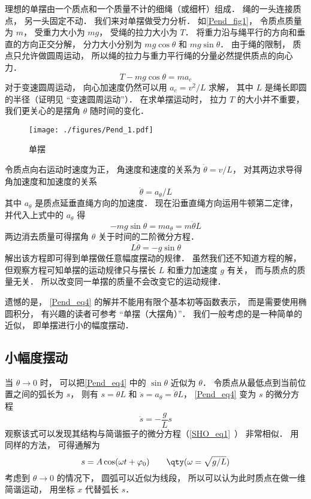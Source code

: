

理想的单摆由一个质点和一个质量不计的细绳（或细杆）组成． 绳的一头连接质点， 另一头固定不动． 我们来对单摆做受力分析． 如\autoref{Pend_fig1}， 令质点质量为 $m$， 受重力大小为 $mg$， 受绳的拉力大小为 $T$． 将重力沿与绳平行的方向和垂直的方向正交分解， 分力大小分别为 $mg\cos\theta$ 和 $mg\sin\theta$． 由于绳的限制， 质点只允许做圆周运动， 所以绳的拉力与重力平行绳的分量必然提供质点的向心力．
\begin{equation}
T - mg\cos\theta = ma_c
\end{equation}
对于变速圆周运动， 向心加速度仍然可以用 $a_c = v^2/L$ 求解， 其中 $L$ 是绳长即圆的半径（证明见 “变速圆周运动”）．%
在求单摆运动时， 拉力 $T$ 的大小并不重要， 我们更关心的是摆角 $\theta$ 随时间的变化．
\begin{figure}[ht]
\centering
\texttt{[image: ./figures/Pend\_1.pdf]}
\caption{单摆} \label{Pend_fig1}
\end{figure}

令质点向右运动时速度为正， 角速度和速度的关系为 $\dot\theta = v/L$， 对其两边求导得角加速度和加速度的关系
\begin{equation}
\ddot\theta = a_\theta/L
\end{equation}
其中 $a_\theta$ 是质点延垂直绳方向的加速度． 现在沿垂直绳方向运用牛顿第二定律， 并代入上式中的 $a_\theta$ 得
\begin{equation}
-mg\sin\theta = ma_\theta = m\ddot\theta L
\end{equation}
两边消去质量可得摆角 $\theta$ 关于时间的二阶微分方程．
\begin{equation}\label{Pend_eq4}
L\ddot\theta = - g\sin\theta
\end{equation}
解出该方程即可得到单摆做任意幅度摆动的规律． 虽然我们还不知道方程的解， 但观察方程可知单摆的运动规律只与摆长 $L$ 和重力加速度 $g$ 有关， 而与质点的质量无关． 所以改变同一单摆的质量不会改变它的运动规律．

遗憾的是， \autoref{Pend_eq4} 的解并不能用有限个基本初等函数表示， 而是需要使用椭圆积分， 有兴趣的读者可参考 “单摆（大摆角）”． 我们一般考虑的是一种简单的近似， 即单摆进行小的幅度摆动．

\subsection{小幅度摆动}
当 $\theta \to 0$ 时， 可以把\autoref{Pend_eq4} 中的 $\sin\theta$ 近似为 $\theta$． 令质点从最低点到当前位置之间的弧长为 $s$， 则有 $s = \theta L$ 和 $\ddot s = a_\theta = \ddot\theta L$， \autoref{Pend_eq4} 变为 $s$ 的微分方程
\begin{equation}
\ddot s = - \frac gL s
\end{equation}
观察该式可以发现其结构与简谐振子的微分方程（\autoref{SHO_eq1}~） 非常相似． 用同样的方法， 可得通解为
\begin{equation}
s = A\cos(\omega t + \varphi_0)  \qquad \qty(\omega  = \sqrt{g/L})
\end{equation}
考虑到 $\theta \to 0$ 的情况下， 圆弧可以近似为线段， 所以可以认为此时质点在做一维简谐运动， 用坐标 $x$ 代替弧长 $s$．
